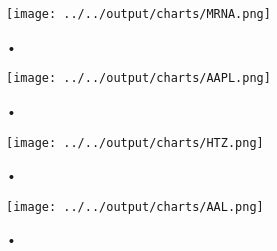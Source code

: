 \documentclass[12pt]{article}
\numberwithin{equation}{section} %
\begin{document}
\begin{figure}[h!]
\caption{•}
\centering
\texttt{[image: ../../output/charts/MRNA.png]}
\end{figure}

\begin{figure}[h!]
\caption{•}
\centering
\texttt{[image: ../../output/charts/AAPL.png]}
\end{figure}

\begin{figure}[h!]
\caption{•}
\centering
\texttt{[image: ../../output/charts/HTZ.png]}
\end{figure}

\begin{figure}[h!]
\caption{•}
\centering
\texttt{[image: ../../output/charts/AAL.png]}
\end{figure}


% 
%
 
 
\end{document}
